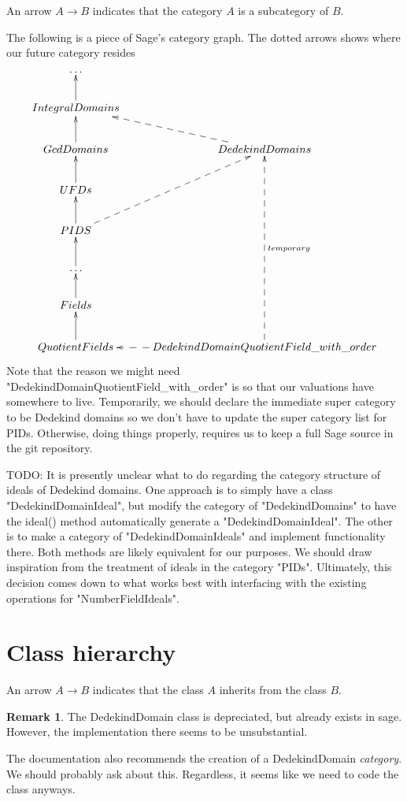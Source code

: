 \documentclass{amsart}
\theoremstyle{definition}
\newtheorem*{remark*}{Remark}
\begin{document}
		An arrow $A \longrightarrow B$ indicates that the category $A$ is a subcategory of $B$.
		
		The following is a piece of Sage's category graph. The dotted arrows shows where our future category resides
		\[
		\xymatrix{
			\ldots \\
			IntegralDomains \ar[u] \\
			GcdDomains \ar[u]   &   DedekindDomains \ar@{-->}[ul] \\
			UFDs \ar[u] \\
			PIDS \ar[u] \ar@{-->}[uur] \\
			\ldots \ar[u] \\
			Fields \ar[u] \\
			QuotientFields \ar[u] &  DedekindDomainQuotientField\_with\_order \ar@{-->}[l] \ar@{-->}[uuuuu]_{temporary} 
		}
		\]
		Note that the reason we might need "DedekindDomainQuotientField\_with\_order" is so that our valuations have somewhere to live. Temporarily, we should declare the immediate super category to be Dedekind domains so we don't have to update the super category list for PIDs. Otherwise, doing things properly, requires us to keep a full Sage source in the git repository.
	
		\hspace{1in}
	
		TODO: It is presently unclear what to do regarding the category structure of ideals of Dedekind domains. One approach is to simply have a class "DedekindDomainIdeal", but modify the category of "DedekindDomains" to have the ideal() method automatically generate a "DedekindDomainIdeal". The other is to make a category of "DedekindDomainIdeals" and implement functionality there. Both methods are likely equivalent for our purposes. We should draw inspiration from the treatment of ideals in the category "PIDs". Ultimately, this decision comes down to what works best with interfacing with the existing operations for "NumberFieldIdeals".
			
	\section{Class hierarchy}
	
	An arrow $A \longrightarrow B$ indicates that the class $A$ inherits from the class $B$.
	
	\begin{remark*}
		The DedekindDomain class is depreciated, but already exists in sage. However, the implementation there seems to be unsubstantial. 
		
		The documentation also recommends the creation of a DedekindDomain \emph{category}. We should probably ask about this. Regardless, it seems like we need to code the class anyways.
	\end{remark*}
	
\end{document}
